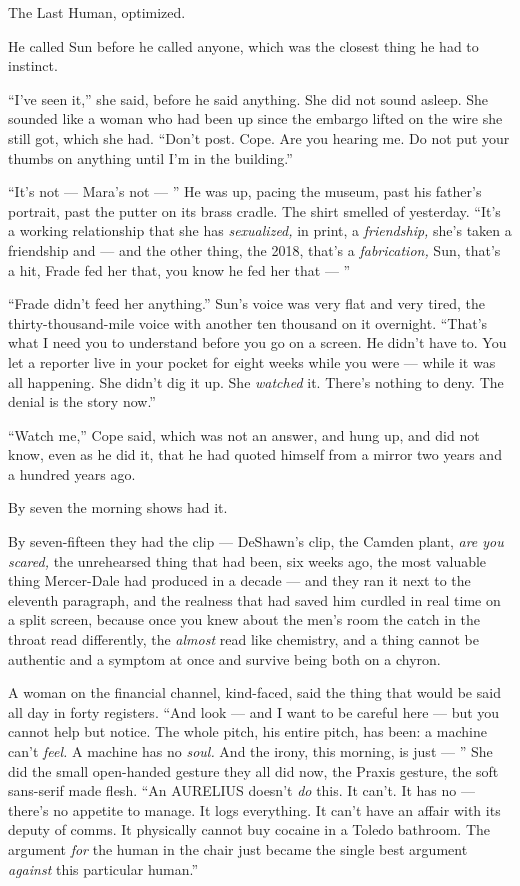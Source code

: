 \documentclass[11pt,openany]{book}
\newcommand{\scenebreak}{\par\vspace{0.5\baselineskip}\begin{center}\textasteriskcentered\quad\textasteriskcentered\quad\textasteriskcentered\end{center}\vspace{0.5\baselineskip}\par}
\begin{document}
The Last Human, optimized.


\scenebreak


He called Sun before he called anyone, which was the closest thing he had to instinct.

``I've seen it,'' she said, before he said anything. She did not sound asleep. She sounded like a woman who had been up since the embargo lifted on the wire she still got, which she had. ``Don't post. Cope. Are you hearing me. Do not put your thumbs on anything until I'm in the building.''

``It's not --- Mara's not --- '' He was up, pacing the museum, past his father's portrait, past the putter on its brass cradle. The shirt smelled of yesterday. ``It's a working relationship that she has \textit{sexualized,} in print, a \textit{friendship,} she's taken a friendship and --- and the other thing, the 2018, that's a \textit{fabrication,} Sun, that's a hit, Frade fed her that, you know he fed her that --- ''

``Frade didn't feed her anything.'' Sun's voice was very flat and very tired, the thirty-thousand-mile voice with another ten thousand on it overnight. ``That's what I need you to understand before you go on a screen. He didn't have to. You let a reporter live in your pocket for eight weeks while you were --- while it was all happening. She didn't dig it up. She \textit{watched} it. There's nothing to deny. The denial is the story now.''

``Watch me,'' Cope said, which was not an answer, and hung up, and did not know, even as he did it, that he had quoted himself from a mirror two years and a hundred years ago.


\scenebreak


By seven the morning shows had it.

By seven-fifteen they had the clip --- DeShawn's clip, the Camden plant, \textit{are you scared,} the unrehearsed thing that had been, six weeks ago, the most valuable thing Mercer-Dale had produced in a decade --- and they ran it next to the eleventh paragraph, and the realness that had saved him curdled in real time on a split screen, because once you knew about the men's room the catch in the throat read differently, the \textit{almost} read like chemistry, and a thing cannot be authentic and a symptom at once and survive being both on a chyron.

A woman on the financial channel, kind-faced, said the thing that would be said all day in forty registers. ``And look --- and I want to be careful here --- but you cannot help but notice. The whole pitch, his entire pitch, has been: a machine can't \textit{feel.} A machine has no \textit{soul.} And the irony, this morning, is just --- '' She did the small open-handed gesture they all did now, the Praxis gesture, the soft sans-serif made flesh. ``An AURELIUS doesn't \textit{do} this. It can't. It has no --- there's no appetite to manage. It logs everything. It can't have an affair with its deputy of comms. It physically cannot buy cocaine in a Toledo bathroom. The argument \textit{for} the human in the chair just became the single best argument \textit{against} this particular human.''
\end{document}
